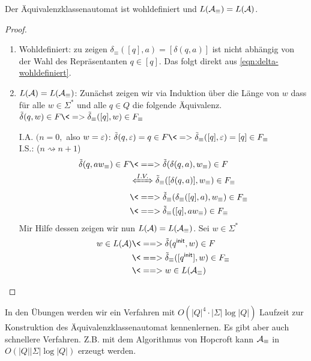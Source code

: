 \begin{Satz}[name={[Äquivalenzklassenautomat ist wohldefiniert]}]
        Der Äquivalenzklassenautomat ist wohldefiniert und $L(\mathcal{A}_\equiv)=L(\mathcal{A})$.
\end{Satz}


\begin{proof}\ 
        \begin{enumerate}
                \item Wohldefiniert: zu zeigen $\delta_\equiv([q],a) =[\delta(q,a)]$ ist nicht abhängig von der Wahl des Repräsentanten $q\in [q]$. Das folgt direkt aus \autoref{eqn:delta-wohldefiniert}.
                \item $L(\mathcal{A})=L(\mathcal{A}_\equiv)$:
                Zunächst zeigen wir via Induktion über die Länge von $w$ dass für alle $w\in\Sigma^*$ und alle $q\in Q$ die folgende Äquivalenz.
                $\tilde\delta(q,w)\in F \<=> \tilde\delta_\equiv([q],w)\in F_\equiv$
                
                
                I.A. $(n=0,$ also $w=\varepsilon)$: $\tilde\delta(q,\Eps)=q\in F \<=> \tilde\delta_\equiv([q],\Eps)=[q]\in F_\equiv$\\
                I.S.: ($n\rightsquigarrow n+1$) \begin{align*}
                \tilde\delta(q,aw_\equiv)\in F &\<==> \tilde\delta(\delta(q,a),w_\equiv)\in F\\ &\xLeftrightarrow{I.V.} \tilde\delta_\equiv([\delta(q,a)],w_\equiv)\in F_\equiv\\
                &\<==> \tilde\delta_\equiv(\delta_\equiv([q],a),w_\equiv)\in F_\equiv\\
                &\<==> \tilde\delta_\equiv([q],a w_\equiv)\in F_\equiv
                \end{align*}
                Mir Hilfe dessen zeigen wir nun $L(\mathcal{A})=L(\mathcal{A}_\equiv)$. Sei $w\in\Sigma^*$
                \begin{align*}
                 w\in L(\A)
                 & \<==> \tilde\delta(\qinit,w) \in F\\
                 & \<==> \tilde\delta_\equiv([\qinit],w) \in F_\equiv\\
                 & \<==> w\in L(\A_\equiv)
                \end{align*}
        \end{enumerate}
\end{proof}
In den Übungen werden wir ein Verfahren mit $O(|Q|^4\cdot |\Sigma|\log|Q|)$ Laufzeit zur Konstruktion des Äquivalenzklassenautomat kennenlernen. Es gibt aber auch schnellere Verfahren. Z.B. mit dem Algorithmus von Hopcroft kann $\mathcal{A}_\equiv$ in $O(|Q||\Sigma|\log|Q|)$ erzeugt werden.

